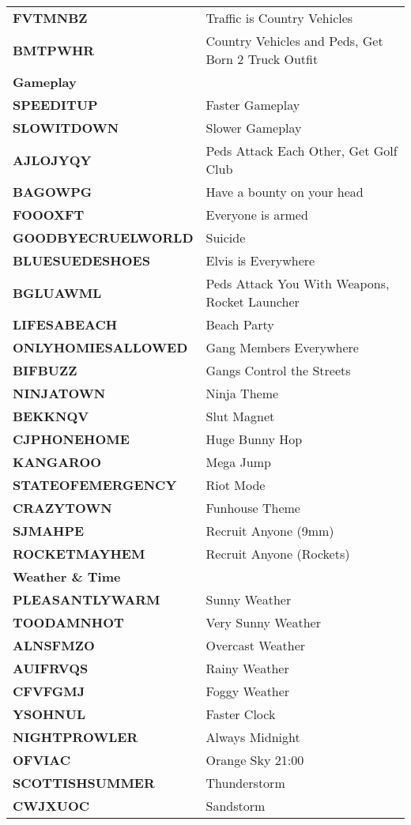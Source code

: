 \documentclass{article}
\begin{document}
\begin{small}
\begin{longtable}{|l l|}
	\textbf{FVTMNBZ }& Traffic is Country Vehicles \\
	\textbf{BMTPWHR }& Country Vehicles and Peds, Get Born 2 Truck Outfit \\
	\hline
	\hline
	\textbf{Gameplay}& \\
	\hline
	\textbf{SPEEDITUP }& Faster Gameplay \\
	\textbf{SLOWITDOWN }& Slower Gameplay \\
	\textbf{AJLOJYQY }& Peds Attack Each Other, Get Golf Club \\
	\textbf{BAGOWPG }& Have a bounty on your head \\
	\textbf{FOOOXFT }& Everyone is armed \\
	\textbf{GOODBYECRUELWORLD }& Suicide \\
	\textbf{BLUESUEDESHOES }& Elvis is Everywhere \\
	\textbf{BGLUAWML }& Peds Attack You With Weapons, Rocket Launcher \\
	\textbf{LIFESABEACH}& Beach Party \\
	\textbf{ONLYHOMIESALLOWED }& Gang Members Everywhere \\
	\textbf{BIFBUZZ }& Gangs Control the Streets \\
	\textbf{NINJATOWN }& Ninja Theme \\
	\textbf{BEKKNQV }& Slut Magnet \\
	\textbf{CJPHONEHOME }& Huge Bunny Hop \\
	\textbf{KANGAROO }& Mega Jump \\
	\textbf{STATEOFEMERGENCY }& Riot Mode \\
	\textbf{CRAZYTOWN }& Funhouse Theme \\
	\textbf{SJMAHPE }& Recruit Anyone (9mm) \\
	\textbf{ROCKETMAYHEM }& Recruit Anyone (Rockets) \\
	\hline
	\hline
	\textbf{Weather \& Time}& \\
	\hline
	\textbf{PLEASANTLYWARM }& Sunny Weather \\
	\textbf{TOODAMNHOT }& Very Sunny Weather \\
	\textbf{ALNSFMZO }& Overcast Weather \\
	\textbf{AUIFRVQS }& Rainy Weather \\
	\textbf{CFVFGMJ }& Foggy Weather \\
	\textbf{YSOHNUL }& Faster Clock \\
	\textbf{NIGHTPROWLER }& Always Midnight \\
	\textbf{OFVIAC }& Orange Sky 21:00 \\
	\textbf{SCOTTISHSUMMER }& Thunderstorm \\
	\textbf{CWJXUOC }& Sandstorm \\
	\hline
\end{longtable}
\end{small}
\end{document}
